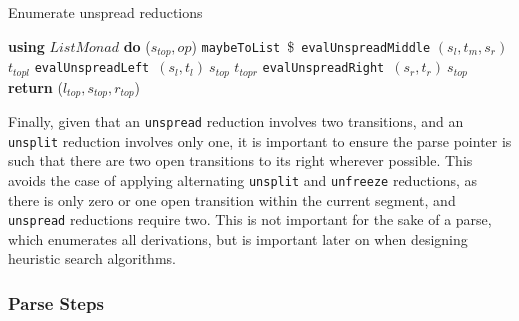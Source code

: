\documentclass[12pt,a4paper,twoside,openright]{report}
\theoremstyle{definition}
\begin{document}
\begin{algorithm}[h]
  \caption{Enumerate unspread reductions}
  \label{code:heuristic0}
  \begin{algorithmic}[1]
    \State \textbf{using} $List Monad$ \textbf{do} 
    \State ($s_{top}, op$) \gets \texttt{maybeToList}~\$~\texttt{evalUnspreadMiddle} $(s_l, t_m, s_r)$ 
    \State $t_{topl}$ \gets \texttt{evalUnspreadLeft}~$(s_l, t_l)~s_{top}$
    \State $t_{topr}$ \gets \texttt{evalUnspreadRight}~$(s_r, t_r)~s_{top}$
    \State \textbf{return} ($l_{top}, s_{top}, r_{top}$)
    \EndFunction
  \end{algorithmic}
\end{algorithm}

Finally, given that an \texttt{unspread} reduction involves two transitions, and an \texttt{unsplit} reduction involves only one, it is important to ensure the parse pointer is such that there are two open transitions to its right wherever possible. This avoids the case of applying alternating \texttt{unsplit} and \texttt{unfreeze} reductions, as there is only zero or one open transition within the current segment, and \texttt{unspread} reductions require two. This is not important for the sake of a parse, which enumerates all derivations, but is important later on when designing heuristic search algorithms. \footnotemark 


\subsubsection{Parse Steps}
\end{document}
